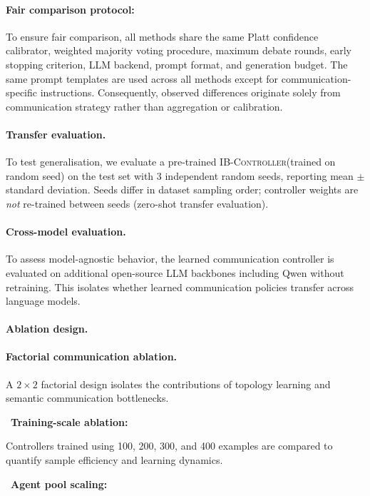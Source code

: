 \documentclass[11pt]{article}
\newcommand{\ctrl}{\textsc{IB-Controller}\xspace}
\begin{document}
\paragraph{Fair comparison protocol:}

To ensure fair comparison, all methods share the same
Platt confidence calibrator,
weighted majority voting procedure,
maximum debate rounds,
early stopping criterion,
LLM backend,
prompt format,
and generation budget. The same prompt templates are used across all methods except for communication-specific instructions.
Consequently, observed differences originate solely from communication strategy
rather than aggregation or calibration.
\paragraph{Transfer evaluation.}
To test generalisation, we evaluate a pre-trained \ctrl (trained on
random seed) on the test set with 3 independent random seeds, reporting mean
$\pm$ standard deviation.
Seeds differ in dataset sampling order; controller weights are \emph{not}
re-trained between seeds (zero-shot transfer evaluation).

\paragraph{Cross-model evaluation.}

To assess model-agnostic behavior,
the learned communication controller is evaluated on additional open-source LLM
backbones including Qwen without retraining.
This isolates whether learned communication policies transfer across language
models.

\paragraph{Ablation design.}
\paragraph{Factorial communication ablation.}

A $2\times2$ factorial design isolates the contributions of topology learning
and semantic communication bottlenecks.

~\textbf{Training-scale ablation:}

Controllers trained using
100,
200,
300,
and
400
examples are compared to quantify sample efficiency and learning dynamics.

~\textbf{Agent pool scaling:}
\end{document}
